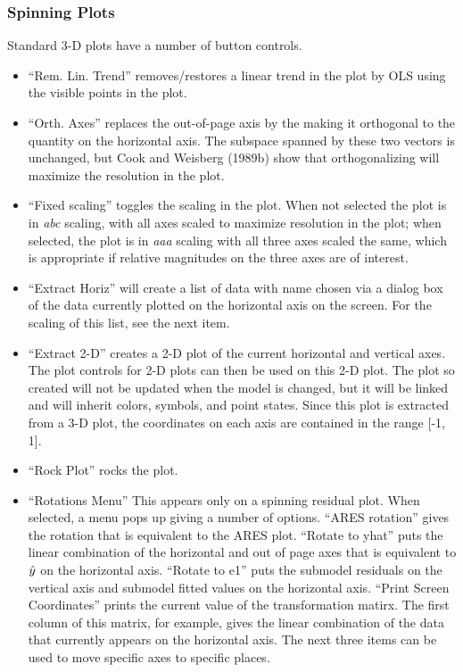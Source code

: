 \subsubsection{Spinning Plots}
Standard 3-D plots have a number of button controls. 
\begin{itemize}
\item ``Rem. Lin. Trend'' removes/restores
 a linear trend in the plot by OLS using the visible points in the plot.
\item ``Orth. Axes'' replaces the out-of-page axis by the making it orthogonal
to the quantity on the horizontal axis.  The subspace spanned by these two
vectors is unchanged, but Cook and Weisberg (1989b) show that orthogonalizing
will maximize the resolution in the plot.
\item ``Fixed scaling'' toggles the scaling in the plot.  When not selected
the plot is in {\sl abc} scaling, with all axes scaled to maximize resolution
in the plot; when selected, the plot is in {\sl aaa}
scaling with all three axes scaled the same, which is appropriate if relative
magnitudes on the three axes are of interest.  
\item ``Extract Horiz'' will create a list of data with name chosen via a
dialog box 
of the data currently plotted on the horizontal axis on the screen.  For the
scaling of this list, see the next item.
\item ``Extract 2-D'' creates a 2-D plot of the current horizontal and
vertical axes.  The plot controls for 2-D plots can then be used on this 2-D
plot.  The plot so created will not be updated when the model is changed, but
it will be linked and will inherit colors, symbols, and point states.  Since
this plot is extracted from a 3-D plot, the coordinates on each axis are
contained in the range [-1, 1].
\item ``Rock Plot'' rocks the plot.
\item ``Rotations Menu''  This appears only on a spinning residual plot.  When
selected, a menu pops up giving a number of options.  ``ARES rotation'' gives
the rotation that is equivalent to the ARES plot.  ``Rotate to yhat'' puts the
linear combination of the horizontal and out of page axes that is equivalent
to $\mbox{$\hat{y}$}$ on the horizontal axis.  ``Rotate to e1'' puts the submodel
residuals on the vertical axis and submodel fitted values on the horizontal
axis.  ``Print Screen Coordinates'' prints the
current value of the transformation matirx.  The first column of this matrix,
for example, gives the linear combination of the data that currently appears
on the horizontal axis.  The next three items can be used to move specific
axes to specific places. 
\end{itemize}

